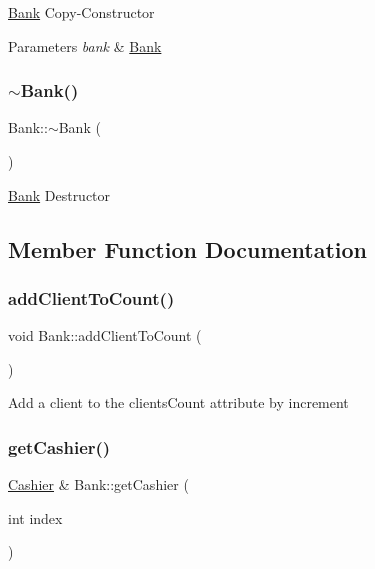 \hyperlink{classBank}{Bank} Copy-\/\+Constructor 
\begin{DoxyParams}{Parameters}
{\em bank} & \hyperlink{classBank}{Bank} \\
\hline
\end{DoxyParams}
\mbox{\label{classBank_a86eb33b90cf9dbf0a528155c5bfde004}} 
\subsubsection{\texorpdfstring{$\sim$\+Bank()}{~Bank()}}
{\footnotesize\ttfamily Bank\+::$\sim$\+Bank (\begin{DoxyParamCaption}{ }\end{DoxyParamCaption})}

\hyperlink{classBank}{Bank} Destructor 

\subsection{Member Function Documentation}
\mbox{\label{classBank_a2fe9f47aabc4fe73adc07af460f30dcc}} 
\subsubsection{\texorpdfstring{add\+Client\+To\+Count()}{addClientToCount()}}
{\footnotesize\ttfamily void Bank\+::add\+Client\+To\+Count (\begin{DoxyParamCaption}{ }\end{DoxyParamCaption})}

Add a client to the clients\+Count attribute by increment \mbox{\label{classBank_a7eb0b71ef408a8e9798eb1d28e1733ea}} 
\subsubsection{\texorpdfstring{get\+Cashier()}{getCashier()}}
{\footnotesize\ttfamily \hyperlink{classCashier}{Cashier} \& Bank\+::get\+Cashier (\begin{DoxyParamCaption}\item[{int}]{index }\end{DoxyParamCaption})}

